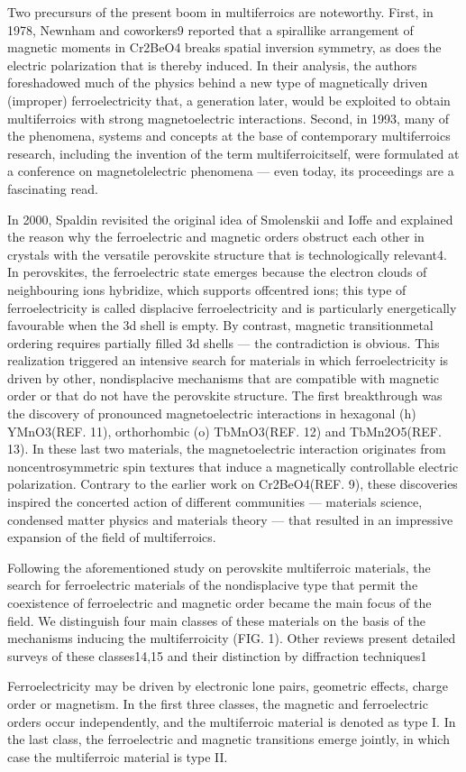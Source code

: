 Two precursurs of the present boom in multiferroics are  noteworthy.  First,  in  1978,  Newnham  and  co­workers9  reported  that  a  spiral­like  arrangement  of  magnetic moments in Cr2BeO4 breaks spatial inversion symmetry, as does the electric polarization that is thereby induced. In their analysis, the authors foreshadowed much of the physics behind a new type of magnetically driven (improper) ferroelectricity that, a generation later, would be exploited to obtain multiferroics with strong magnetoelectric interactions. Second, in 1993, many of the phenomena, systems and concepts at the base of contemporary multiferroics research, including the invention of the term multiferroicitself, were formulated at a conference on magnetolelectric phenomena — even today, its proceedings are a fascinating read.

In  2000,  Spaldin  revisited  the  original  idea  of  Smolenskii and Ioffe and explained the reason why the ferroelectric and magnetic orders obstruct each other in crystals with the versatile perovskite structure that is technologically relevant4. In perovskites, the ferro­electric state emerges because the electron clouds of neighbouring  ions  hybridize,  which  supports  off­centred ions; this type of ferroelectricity is called displacive ferroelectricity and is particularly energetically favourable when the 3d shell is empty. By contrast, magnetic transition­metal ordering requires partially filled 3d shells — the contradiction is obvious. This realization triggered an intensive search for materials in which ferroelectricity is driven by other, nondisplacive mechanisms that are compatible with magnetic order or that do not have the perovskite structure. The first breakthrough was the discovery of pronounced magnetoelectric interactions in hexagonal (h­) YMnO3(REF. 11), orthorhombic (o­) TbMnO3(REF. 12)  and  TbMn2O5(REF. 13). In these last two materials, the magnetoelectric interaction originates from non­centrosymmetric spin textures that induce a magnetically controllable electric polarization. Contrary to the earlier work on Cr2BeO4(REF. 9), these discoveries inspired the concerted action of different communities — materials science, condensed matter physics and materials theory — that resulted in an impressive expansion of the field of multiferroics.

Following the aforementioned study on perovskite multi­ferroic materials, the search for ferroelectric materials of the nondisplacive type that permit the coexistence of ferroelectric and magnetic order became the main focus of the field. We distinguish four main classes of these materials on the basis of the mechanisms inducing the multiferroicity (FIG. 1). Other reviews present detailed surveys of these classes14,15 and their distinction by diffraction techniques1

Ferroelectricity may be driven by electronic lone pairs, geometric effects, charge order or magnetism. In the first three classes, the magnetic and ferroelectric orders occur independently, and the multiferroic material is denoted as type I. In the last class, the ferroelectric and magnetic transitions emerge jointly, in which case the multiferroic material is type II.
